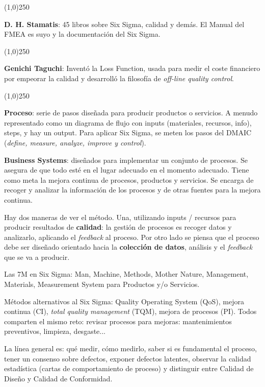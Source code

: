 \documentclass[]{article}
\begin{document}
\begin{center}
	\line(1,0){250}
\end{center}
\textbf{D. H. Stamatis}: 45 libros sobre Six Sigma, calidad y demás. El Manual del FMEA es suyo y la documentación del Six Sigma.
\begin{center}
	\line(1,0){250}
\end{center}
\textbf{Genichi Taguchi}: Inventó la Loss Function, usada para medir el coste financiero por empeorar la calidad y desarrolló la filosofía de \textit{off-line quality control}. 
\begin{center}
	\line(1,0){250}
\end{center}
\textbf{Proceso}: serie de pasos diseñada para producir productos o servicios. A menudo representado como un diagrama de flujo con inputs (materiales, recursos, info), steps, y hay un output. Para aplicar Six Sigma, se meten los pasos del DMAIC (\textit{define, measure, analyze, improve y control}). 

\textbf{Business Systems}: diseñados para implementar un conjunto de procesos. Se asegura de que todo esté en el lugar adecuado en el momento adecuado. Tiene como meta la mejora continua de procesos, productos y servicios. Se encarga de recoger y analizar la información de los procesos y de otras fuentes para la mejora continua.  

Hay dos maneras de ver el método. Una, utilizando inputs / recursos para producir resultados de \textbf{calidad}: la gestión de procesos es recoger datos y analizarlo, aplicando el \textit{feedback} al proceso. Por otro lado se piensa que el proceso debe ser diseñado orientado hacia la \textbf{colección de datos}, análisis y el \textit{feedback} que se va a producir.

Las 7M en Six Sigma: Man, Machine, Methods, Mother Nature, Management, Materials, Measurement System para Productos y/o Servicios.

Métodos alternativos al Six Sigma: Quality Operating System (QoS), mejora continua (CI), \textit{total quality management} (TQM), mejora de procesos (PI). Todos comparten el mismo reto: revisar procesos para mejoras: mantenimientos preventivos, limpieza, desgaste...

La línea general es: qué medir, cómo medirlo, saber si es fundamental el proceso, tener un consenso sobre defectos, exponer defectos latentes, observar la calidad estadística (cartas de comportamiento de proceso) y distinguir entre Calidad de Diseño y Calidad de Conformidad. 
\end{document}
